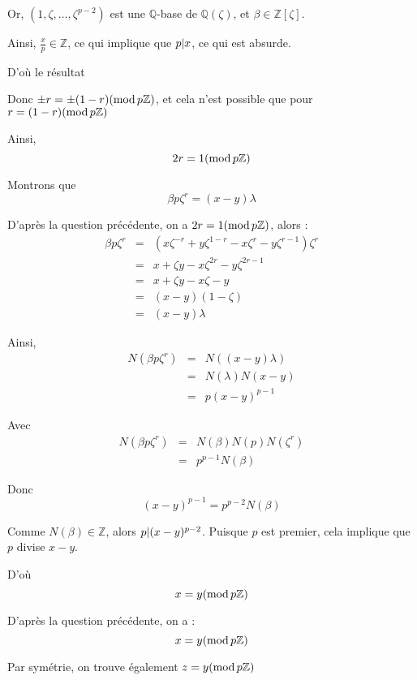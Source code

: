 Or, $(1, \zeta, \ldots, \zeta^{p - 2})$ est une $\mathbb{Q}$-base de
$\mathbb{Q} (\zeta)$, et $\beta \in \mathbb{Z} [\zeta]$.

Ainsi, $\frac{x}{p} \in \mathbb{Z}$, ce qui implique que $p | x $,
ce qui est absurde.

D'o{\`u} le r{\'e}sultat

Donc $\pm r = \pm (1 - r)  (\operatorname{mod} p\mathbb{Z})$, et cela n'est possible
que pour $r = (1 - r) (\operatorname{mod} p\mathbb{Z})$

Ainsi,
\[ 2 r = 1 (\operatorname{mod} p\mathbb{Z}) \]


 Montrons que
\[ \beta p \zeta^r = (x - y) \lambda \]


D'apr{\`e}s la question pr{\'e}c{\'e}dente, on a $2 r = 1 (\operatorname{mod}
p\mathbb{Z})$, alors :
\begin{eqnarray*}
  \beta p \zeta^r & = & (x \zeta^{- r} + y \zeta^{1 - r} - x \zeta^r - y
  \zeta^{r - 1}) \zeta^r\\
  & = & x + \zeta y - x \zeta^{2 r} - y \zeta^{2 r - 1}\\
  & = & x + \zeta y - x \zeta - y\\
  & = & (x - y) (1 - \zeta)\\
  & = & (x - y) \lambda
\end{eqnarray*}


Ainsi,
\begin{eqnarray*}
  N (\beta p \zeta^r) & = & N ((x - y) \lambda)\\
  & = & N (\lambda) N (x - y)\\
  & = & p (x - y)^{p - 1}
\end{eqnarray*}


Avec
\begin{eqnarray*}
  N (\beta p \zeta^r) & = & N (\beta) N (p) N (\zeta^r)\\
  & = & p^{p - 1} N (\beta)
\end{eqnarray*}


Donc
\[ (x - y)^{p - 1} = p^{p - 2} N (\beta) \]


Comme $N (\beta) \in \mathbb{Z}$, alors $p | (x - y)^{p - 2} $.
Puisque $p$ est premier, cela implique que $p$ divise $x - y$.

D'o{\`u}
\[ x = y (\operatorname{mod} p\mathbb{Z}) \]


 D'apr{\`e}s la question pr{\'e}c{\'e}dente, on a :
\[ x = y (\operatorname{mod} p\mathbb{Z}) \]


Par sym{\'e}trie, on trouve {\'e}galement $z = y (\operatorname{mod} p\mathbb{Z})$

